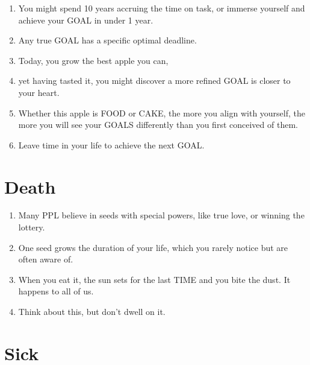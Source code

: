 \documentclass[
]{book}
\providecommand{\tightlist}{%
  \setlength{\itemsep}{0pt}\setlength{\parskip}{0pt}}
\begin{document}
\begin{enumerate}
\item
  You might spend 10 years accruing the time on task, or immerse yourself
  and achieve your GOAL in under 1 year.
\item
  Any true GOAL has a specific optimal deadline.
\item
  Today, you grow the best apple you can,
\item
  yet having tasted it, you might discover a more refined GOAL is closer to
  your heart.
\item
  Whether this apple is FOOD or CAKE, the more you align with yourself, the
  more you will see your GOALS differently than you first conceived of them.
\item
  Leave time in your life to achieve the next GOAL.
\end{enumerate}

\hypertarget{death}{%
\section{Death}\label{death}}

\begin{enumerate}
\def\labelenumi{\arabic{enumi}.}
\setcounter{enumi}{25}
\tightlist
\item
  Many PPL believe in seeds with special powers, like true love, or winning the
  lottery.
\item
  One seed grows the duration of your life, which you rarely notice but are often
  aware of.
\item
  When you eat it, the sun sets for the last TIME and you bite the dust. It happens
  to all of us.
\item
  Think about this, but don't dwell on it.
\end{enumerate}

\hypertarget{sick}{%
\section{Sick}\label{sick}}
\end{document}
